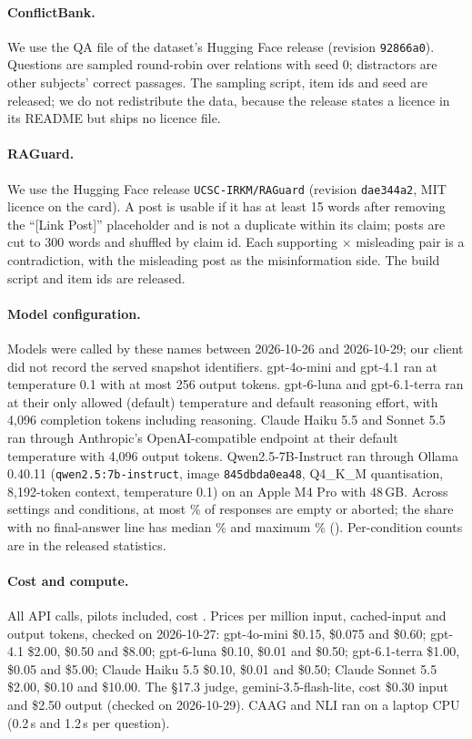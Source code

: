 \paragraph{ConflictBank.} We use the QA file of the dataset's Hugging Face release (revision \texttt{92866a0}). Questions are sampled round-robin over relations with seed 0; distractors are other subjects' correct passages. The
sampling script, item ids and seed are released; we do not redistribute the data, because the release states
a licence in its README but ships no licence file.

\paragraph{RAGuard.} We use the Hugging Face release \texttt{UCSC-IRKM/RAGuard} (revision \texttt{dae344a2}, MIT
licence on the card). A post is usable if it has at least 15 words after removing the ``[Link Post]'' placeholder and is
not a duplicate within its claim; posts are cut to 300 words and shuffled by claim id. Each supporting $\times$ misleading
pair is a contradiction, with the misleading post as the misinformation side. The build script and item ids are
released.

\paragraph{Model configuration.} Models were called by these names between 2026-10-26 and 2026-10-29;
our client did not record the served snapshot identifiers. gpt-4o-mini and gpt-4.1 ran at temperature 0.1
with at most 256 output tokens. gpt-6-luna and gpt-6.1-terra ran at their only allowed (default) temperature and default
reasoning effort, with 4,096 completion tokens including reasoning. Claude Haiku 5.5 and Sonnet 5.5 ran through
Anthropic's OpenAI-compatible endpoint at their default temperature with 4,096 output tokens. Qwen2.5-7B-Instruct ran
through Ollama 0.40.11 (\texttt{qwen2.5:7b-instruct}, image \texttt{845dbda0ea48}, Q4\_K\_M quantisation, 8,192-token
context, temperature 0.1) on an Apple M4 Pro with 48\,GB. Across settings and conditions, at most \truncMaxEmpty\% of
responses are empty or aborted; the share with no final-answer line has median \truncMedNoFinal\% and maximum
\truncMaxNoFinal\% (\truncMaxAt). Per-condition counts are in the released statistics.

\paragraph{Cost and compute.} All API calls, pilots included, cost \totalSpend. Prices per million input, cached-input and output tokens, checked on 2026-10-27: gpt-4o-mini \$0.15, \$0.075 and \$0.60; gpt-4.1 \$2.00, \$0.50 and \$8.00; gpt-6-luna \$0.10, \$0.01 and \$0.50; gpt-6.1-terra \$1.00, \$0.05 and \$5.00; Claude Haiku 5.5 \$0.10, \$0.01 and
\$0.50; Claude Sonnet 5.5 \$2.00, \$0.10 and \$10.00. The \S17.3 judge, gemini-3.5-flash-lite, cost \$0.30 input and \$2.50 output (checked on 2026-10-29). CAAG and NLI ran on a
laptop CPU (0.2\,s and 1.2\,s per question).
